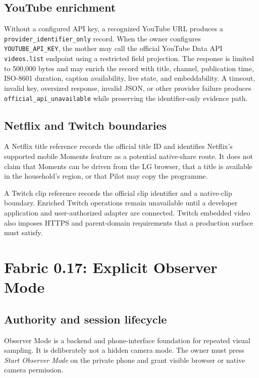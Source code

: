 \documentclass[11pt,a4paper]{article}
\begin{document}
\subsection{YouTube enrichment}

Without a configured API key, a recognized YouTube URL produces a
\nolinkurl{provider_identifier_only} record.  When the owner configures
\nolinkurl{YOUTUBE_API_KEY}, the mother may call the official YouTube Data API
\nolinkurl{videos.list} endpoint using a restricted field projection.  The
response is limited to 500,000 bytes and may enrich the record with title,
channel, publication time, ISO-8601 duration, caption availability, live state,
and embeddability.\cite{youtubevideos} A timeout, invalid key, oversized
response, invalid JSON,
or other provider failure produces \nolinkurl{official_api_unavailable} while
preserving the identifier-only evidence path.

\subsection{Netflix and Twitch boundaries}

A Netflix title reference records the official title ID and identifies
Netflix's supported mobile Moments feature as a potential native-share
route.\cite{netflixmoments}
It does not claim that Moments can be driven from the LG browser, that a title
is available in the household's region, or that Pilot may copy the programme.

A Twitch clip reference records the official clip identifier and a native-clip
boundary.  Enriched Twitch operations remain unavailable until a developer
application and user-authorized adapter are connected.  Twitch embedded video
also imposes HTTPS and parent-domain requirements that a production surface
must satisfy.\cite{twitchembed}

\section{Fabric 0.17: Explicit Observer Mode}

\subsection{Authority and session lifecycle}

Observer Mode is a backend and phone-interface foundation for repeated visual
sampling.  It is deliberately not a hidden camera mode.  The owner must press
\emph{Start Observer Mode} on the private phone and grant visible browser or
native camera permission.
\end{document}
